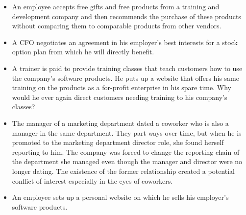 \documentclass[12pt,a4paper,oneside]{article}
\begin{document}
\begin{itemize}
\item An employee accepts free gifts and free products from a training and development company and then recommends the purchase of these products without comparing them to comparable products from other vendors.
\item A CFO negotiates an agreement in his employer's best interests for a stock option plan from which he will directly benefit.
\item A trainer is paid to provide training classes that teach customers how to use the company's software products. He puts up a website that offers his same training on the products as a for-profit enterprise in his spare time. Why would he ever again direct customers needing training to his company's classes?
\item The manager of a marketing department dated a coworker who is also a manager in the same department. They part ways over time, but when he is promoted to the marketing department director role, she found herself reporting to him. The company was forced to change the reporting chain of the department she managed even though the manager and director were no longer dating. The existence of the former relationship created a potential conflict of interest especially in the eyes of coworkers.
\item An employee sets up a personal website on which he sells his employer's software products.
\end{itemize}

\clearpage
\end{document}
